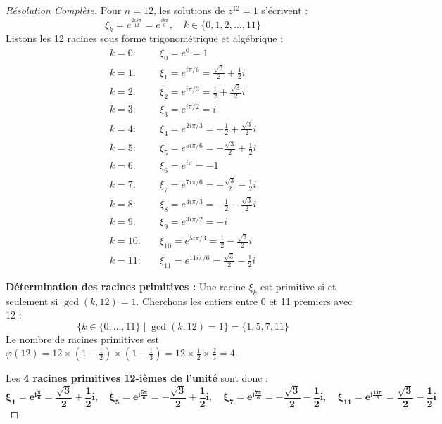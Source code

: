 \documentclass[12pt,a4paper]{report}
\begin{document}
\begin{proof}[Résolution Complète]
Pour $n = 12$, les solutions de $z^{12} = 1$ s'écrivent :
\[ \xi_k = e^{\frac{2ik\pi}{12}} = e^{\frac{ik\pi}{6}}, \quad k \in \{0, 1, 2, \dots, 11\} \]
Listons les 12 racines sous forme trigonométrique et algébrique :
\begin{align*}
k=0 : \quad & \xi_0 = e^0 = 1 \\
k=1 : \quad & \xi_1 = e^{i\pi/6} = \frac{\sqrt{3}}{2} + \frac{1}{2}i \\
k=2 : \quad & \xi_2 = e^{i\pi/3} = \frac{1}{2} + \frac{\sqrt{3}}{2}i \\
k=3 : \quad & \xi_3 = e^{i\pi/2} = i \\
k=4 : \quad & \xi_4 = e^{2i\pi/3} = -\frac{1}{2} + \frac{\sqrt{3}}{2}i \\
k=5 : \quad & \xi_5 = e^{5i\pi/6} = -\frac{\sqrt{3}}{2} + \frac{1}{2}i \\
k=6 : \quad & \xi_6 = e^{i\pi} = -1 \\
k=7 : \quad & \xi_7 = e^{7i\pi/6} = -\frac{\sqrt{3}}{2} - \frac{1}{2}i \\
k=8 : \quad & \xi_8 = e^{4i\pi/3} = -\frac{1}{2} - \frac{\sqrt{3}}{2}i \\
k=9 : \quad & \xi_9 = e^{3i\pi/2} = -i \\
k=10 : \quad & \xi_{10} = e^{5i\pi/3} = \frac{1}{2} - \frac{\sqrt{3}}{2}i \\
k=11 : \quad & \xi_{11} = e^{11i\pi/6} = \frac{\sqrt{3}}{2} - \frac{1}{2}i
\end{align*}

\textbf{Détermination des racines primitives :}  
Une racine $\xi_k$ est primitive si et seulement si $\gcd(k, 12) = 1$.  
Cherchons les entiers entre 0 et 11 premiers avec 12 :
\[ \{ k \in \{0, \dots, 11\} \mid \gcd(k, 12) = 1 \} = \{1, 5, 7, 11\} \]
Le nombre de racines primitives est $\varphi(12) = 12 \times \left(1 - \frac{1}{2}\right) \times \left(1 - \frac{1}{3}\right) = 12 \times \frac{1}{2} \times \frac{2}{3} = 4$.

Les \textbf{4 racines primitives 12-ièmes de l'unité} sont donc :
\[ \mathbf{\xi_1 = e^{i\frac{\pi}{6}} = \frac{\sqrt{3}}{2} + \frac{1}{2}i}, \quad 
\mathbf{\xi_5 = e^{i\frac{5\pi}{6}} = -\frac{\sqrt{3}}{2} + \frac{1}{2}i}, \quad 
\mathbf{\xi_7 = e^{i\frac{7\pi}{6}} = -\frac{\sqrt{3}}{2} - \frac{1}{2}i}, \quad 
\mathbf{\xi_{11} = e^{i\frac{11\pi}{6}} = \frac{\sqrt{3}}{2} - \frac{1}{2}i} \]
\end{proof}

\vspace{0.5cm}
\end{document}
